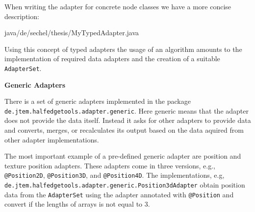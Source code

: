 \documentclass[Thesis.tex]{subfiles}
\begin{document}
When writing the adapter for concrete node classes we have a more concise description:

 {java/de/sechel/thesis/MyTypedAdapter.java}

Using this concept of typed adapters the usage of an algorithm amounts to the implementation of
required data adapters and the creation of a suitable {\tt AdapterSet}.



{\bf Generic Adapters}

There is a set of generic adapters implemented in the package 
{\tt de.jtem.half\-edge\-tools.adap\-ter.generic}. Here generic means that the adapter does not provide
the data itself. Instead it asks for other adapters to provide data and converts, merges, or recalculates its
output based on the data aquired from other adapter implementations.

The most important example of a pre-defined generic adapter are position and texture position adapters.
These adapters come in three versions, e.g., {\tt @Position2D}, {\tt @Position3D}, and {\tt @Position4D}. The implementations, e.g, {\tt de.jtem.half\-edge\-tools.adapter.generic.Position\-3dAdapter} obtain position
data from the {\tt AdapterSet} using the adapter annotated with {\tt @Position} and convert if the lengths
of arrays is not equal to $3$.
\end{document}
